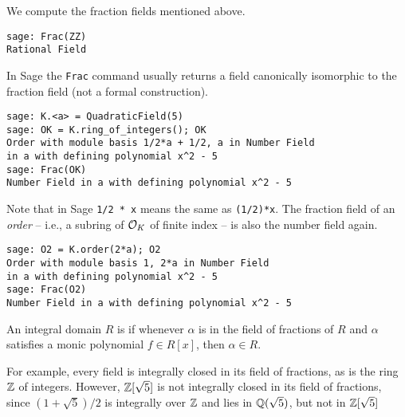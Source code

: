 \begin{example}
We compute the fraction fields mentioned above.
\begin{lstlisting}
sage: Frac(ZZ)
Rational Field
\end{lstlisting}
In Sage the {\tt Frac} command usually returns a field canonically
isomorphic to the fraction field (not a formal construction).
\begin{lstlisting}
sage: K.<a> = QuadraticField(5)
sage: OK = K.ring_of_integers(); OK
Order with module basis 1/2*a + 1/2, a in Number Field
in a with defining polynomial x^2 - 5
sage: Frac(OK)
Number Field in a with defining polynomial x^2 - 5
\end{lstlisting}%

Note that in Sage {\tt 1/2 * x} means the same as {\tt (1/2)*x}.
\noindent{}The fraction field of an {\em order} -- i.e., a subring of $\mathcal{O}_K$ of
finite index -- is also the number field again.
\begin{lstlisting}
sage: O2 = K.order(2*a); O2
Order with module basis 1, 2*a in Number Field
in a with defining polynomial x^2 - 5
sage: Frac(O2)
Number Field in a with defining polynomial x^2 - 5
\end{lstlisting}
\end{example}

\begin{definition}
An integral domain $R$ is  if whenever $\alpha$ is in the field of fractions of $R$
and $\alpha$ satisfies a monic polynomial $f\in R[x]$, then $\alpha
\in R$.
\end{definition}

For example, every field is integrally closed in its field of
fractions, as is the ring $\mathbb{Z}$ of integers.  However, $\mathbb{Z}[\sqrt{5}]$
is not integrally closed in its field of fractions, since
$(1+\sqrt{5})/2$ is integrally over $\mathbb{Z}$ and lies in $\mathbb{Q}(\sqrt{5})$,
but not in $\mathbb{Z}[\sqrt{5}]$

